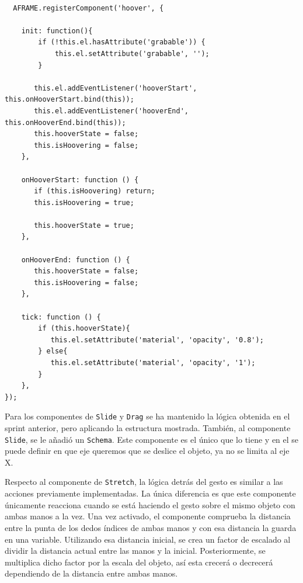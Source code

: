 \documentclass[a4paper, 12pt]{book}
\begin{document}
\begin{lstlisting}[caption=Componente Hoover, captionpos=b, label=lst:Hoover]
  
  AFRAME.registerComponent('hoover', {

    init: function(){
        if (!this.el.hasAttribute('grabable')) {
            this.el.setAttribute('grabable', '');
        }

       this.el.addEventListener('hooverStart', this.onHooverStart.bind(this));
       this.el.addEventListener('hooverEnd', this.onHooverEnd.bind(this));
       this.hooverState = false;
       this.isHoovering = false;
    },

    onHooverStart: function () {
       if (this.isHoovering) return;
       this.isHoovering = true;

       this.hooverState = true;
    },

    onHooverEnd: function () {
       this.hooverState = false;
       this.isHoovering = false;
    },

    tick: function () {
        if (this.hooverState){
           this.el.setAttribute('material', 'opacity', '0.8');
        } else{
           this.el.setAttribute('material', 'opacity', '1');
        }
    },
});
\end{lstlisting}

Para los componentes de \texttt{Slide} y \texttt{Drag} se ha mantenido la lógica obtenida en el sprint anterior, pero aplicando la estructura mostrada. 
También, al componente \texttt{Slide}, se le añadió un \texttt{Schema}. Este componente es el único que lo tiene y en el se puede definir en que eje queremos que se deslice el objeto, ya no se limita al eje X.

Respecto al componente de \texttt{Stretch}, la lógica detrás del gesto es similar a las acciones previamente implementadas. La única diferencia es que este componente únicamente reacciona cuando se está haciendo el gesto sobre el mismo objeto con ambas manos a la vez.
Una vez activado, el componente comprueba la distancia entre la punta de los dedos índices de ambas manos y con esa distancia la guarda en una variable. Utilizando esa distancia inicial, se crea un factor de escalado al dividir la distancia actual entre las manos y la inicial. Posteriormente, se multiplica dicho factor por la escala del objeto, así esta crecerá o decrecerá dependiendo de la distancia entre ambas manos. 
\end{document}
